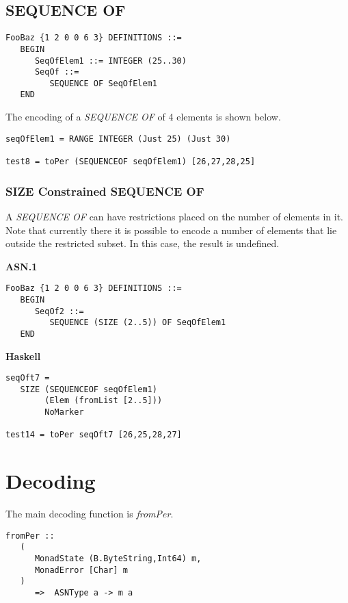 \documentclass{article}
\begin{document}
\subsection{SEQUENCE OF}

\begin{lstlisting}[frame=single]
FooBaz {1 2 0 0 6 3} DEFINITIONS ::=
   BEGIN
      SeqOfElem1 ::= INTEGER (25..30)
      SeqOf ::=
         SEQUENCE OF SeqOfElem1
   END
\end{lstlisting}

The encoding of a {\em SEQUENCE OF} of 4 elements is shown
below.

\begin{lstlisting}[frame=single]
seqOfElem1 = RANGE INTEGER (Just 25) (Just 30)

test8 = toPer (SEQUENCEOF seqOfElem1) [26,27,28,25]
\end{lstlisting}

\subsubsection{SIZE Constrained SEQUENCE OF}

A {\em SEQUENCE OF} can have restrictions placed on the number
of elements in it. Note that currently there it is possible to
encode a number of elements that lie outside the restricted subset.
In this case, the result is undefined.

{\bf ASN.1}

\begin{lstlisting}[frame=single]
FooBaz {1 2 0 0 6 3} DEFINITIONS ::=
   BEGIN
      SeqOf2 ::=
         SEQUENCE (SIZE (2..5)) OF SeqOfElem1
   END
\end{lstlisting}

{\bf Haskell}

\begin{lstlisting}[frame=single]
seqOft7 = 
   SIZE (SEQUENCEOF seqOfElem1) 
        (Elem (fromList [2..5])) 
        NoMarker

test14 = toPer seqOft7 [26,25,28,27]
\end{lstlisting}

\section{Decoding}

The main decoding function is {\em fromPer}.

\begin{lstlisting}[frame=single]
fromPer :: 
   (
      MonadState (B.ByteString,Int64) m, 
      MonadError [Char] m
   ) 
      =>  ASNType a -> m a
\end{lstlisting}
\end{document}
